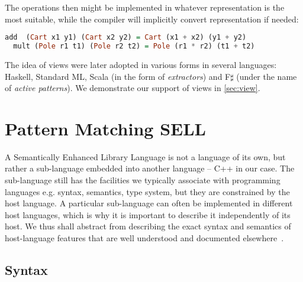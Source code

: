\documentclass{llncs}
\begin{document}
\noindent
The operations then might be implemented in whatever representation is the most 
suitable, while the compiler will implicitly convert representation if needed:

\begin{lstlisting}[language=Haskell,columns=flexible]
  add  (Cart x1 y1) (Cart x2 y2) = Cart (x1 + x2) (y1 + y2)
  mult (Pole r1 t1) (Pole r2 t2) = Pole (r1 * r2) (t1 + t2)
\end{lstlisting}

\noindent
The idea of views were later adopted in various forms in several languages: 
Haskell\cite{views96}, Standard ML\cite{views98}, Scala (in the form of 
\emph{extractors}\cite{EmirThesis}) and F$\sharp$ (under the name of 
\emph{active patterns}\cite{Syme07}). We demonstrate our support of views in 
\textsection\ref{sec:view}.

\section{Pattern Matching SELL} %
\label{sec:pm}

A Semantically Enhanced Library Language is not a language of its own, but 
rather a sub-language embedded into another language -- C++ in our case. The 
sub-language still has the facilities we typically associate with programming 
languages e.g. syntax, semantics, type system, but they are constrained by
the host language. A particular sub-language can often be implemented in 
different host languages, which is why it is important to describe it 
independently of its host. We thus shall abstract from describing the 
exact syntax and semantics of host-language features that are well understood and documented 
elsewhere~\cite{C++11}.

\subsection{Syntax}
\label{sec:syn}
\end{document}
